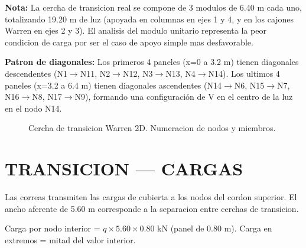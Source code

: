 \documentclass[12pt,a4paper]{article}
\begin{document}
\textbf{Nota:} La cercha de transicion real se compone de 3 modulos de 6.40 m cada uno,
totalizando 19.20 m de luz (apoyada en columnas en ejes 1 y 4, y en los cajones Warren
en ejes 2 y 3). El analisis del modulo unitario representa la peor condicion de carga
por ser el caso de apoyo simple mas desfavorable.

\textbf{Patron de diagonales:} Los primeros 4 paneles (x=0 a 3.2 m) tienen diagonales
descendentes (N1$\to$N11, N2$\to$N12, N3$\to$N13, N4$\to$N14). Los ultimos 4 paneles
(x=3.2 a 6.4 m) tienen diagonales ascendentes (N14$\to$N6, N15$\to$N7, N16$\to$N8,
N17$\to$N9), formando una configuraci\'on de V en el centro de la luz en el nodo N14.

\begin{figure}[H]
\centering
{}
\caption{Cercha de transicion Warren 2D. Numeracion de nodos y miembros.}
\label{fig:transicion-geo}
\end{figure}

\section{TRANSICION --- CARGAS}
Las correas transmiten las cargas de cubierta a los nodos del cordon superior.
El ancho aferente de 5.60 m corresponde a la separacion entre cerchas de transicion.

Carga por nodo interior = $q \times 5.60 \times 0.80$ kN (panel de 0.80 m).
Carga en extremos = mitad del valor interior.
\end{document}
